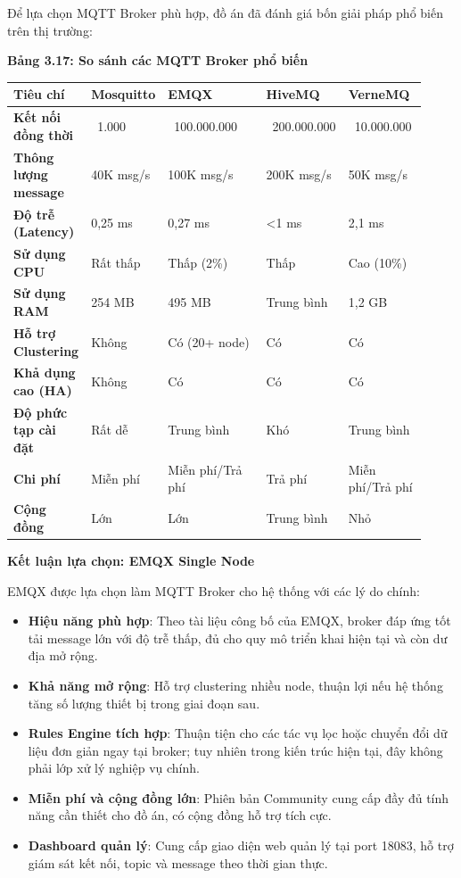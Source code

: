 \documentclass[13pt,a4paper]{extarticle}
\newcounter{none} %
\newcommand{\thesislongtableorignewline}{}
\let\thesislongtableorignewline\\
\renewcommand{\\}{\thesislongtableorignewline\hline}%
\let\\\thesislongtableorignewline
\newcommand{\thesistabletitle}[1]{%
  \begin{center}\textbf{#1}\end{center}%
}
\providecommand{\tightlist}{%
  \setlength{\itemsep}{0pt}\setlength{\parskip}{0pt}}
\begin{document}
Để lựa chọn MQTT Broker phù hợp, đồ án đã đánh giá bốn giải pháp phổ
biến trên thị trường:

\thesistabletitle{Bảng 3.17: So sánh các MQTT Broker phổ biến}

{\def\LTcaptype{none} %
\begin{longtable}{|p{0.12\linewidth}|p{0.10\linewidth}|p{0.30\linewidth}|p{0.20\linewidth}|p{0.20\linewidth}|}
\hline \textbf{Tiêu chí} & \textbf{Mosquitto} & \textbf{EMQX} & \textbf{HiveMQ} & \textbf{VerneMQ} \\
\hline
\endhead
\hline
\endlastfoot
\textbf{Kết nối đồng thời} & ~1.000 &
~100.000.000 & ~200.000.000 &
~10.000.000 \\
\textbf{Thông lượng message} & 40K msg/s & 100K msg/s & 200K msg/s & 50K
msg/s \\
\textbf{Độ trễ (Latency)} & 0,25 ms & 0,27 ms & \textless1 ms & 2,1
ms \\
\textbf{Sử dụng CPU} & Rất thấp & Thấp (2\%) & Thấp & Cao (10\%) \\
\textbf{Sử dụng RAM} & 254 MB & 495 MB & Trung bình & 1,2 GB \\
\textbf{Hỗ trợ Clustering} & Không & Có (20+ node) & Có & Có \\
\textbf{Khả dụng cao (HA)} & Không & Có & Có & Có \\
\textbf{Độ phức tạp cài đặt} & Rất dễ & Trung bình & Khó & Trung bình \\
\textbf{Chi phí} & Miễn phí & Miễn phí/Trả phí & Trả phí & Miễn phí/Trả
phí \\
\textbf{Cộng đồng} & Lớn & Lớn & Trung bình & Nhỏ \\
\end{longtable}
}

\textbf{Kết luận lựa chọn: EMQX Single Node}

EMQX được lựa chọn làm MQTT Broker cho hệ thống với các lý do chính:

\begin{itemize}
\tightlist
\item
  \textbf{Hiệu năng phù hợp}: Theo tài liệu công bố của EMQX, broker đáp
  ứng tốt tải message lớn với độ trễ thấp, đủ cho quy mô triển khai hiện
  tại và còn dư địa mở rộng.
\item
  \textbf{Khả năng mở rộng}: Hỗ trợ clustering nhiều node, thuận lợi nếu
  hệ thống tăng số lượng thiết bị trong giai đoạn sau.
\item
  \textbf{Rules Engine tích hợp}: Thuận tiện cho các tác vụ lọc hoặc
  chuyển đổi dữ liệu đơn giản ngay tại broker; tuy nhiên trong kiến trúc
  hiện tại, đây không phải lớp xử lý nghiệp vụ chính.
\item
  \textbf{Miễn phí và cộng đồng lớn}: Phiên bản Community cung cấp đầy
  đủ tính năng cần thiết cho đồ án, có cộng đồng hỗ trợ tích cực.
\item
  \textbf{Dashboard quản lý}: Cung cấp giao diện web quản lý tại port
  18083, hỗ trợ giám sát kết nối, topic và message theo thời gian thực.
\end{itemize}
\end{document}
